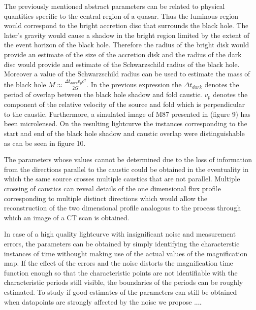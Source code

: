 The previously mentioned abstract parameters can be related to physical quantities specific to the central region of a quasar. Thus the luminous region would correspond to the bright accretion disc that surrounds the black hole. The later's gravity would cause a shadow in the bright region limited by the extent of the event horizon of the black hole. Therefore the radius of the bright disk would provide an estimate of the size of the accretion disk and the radius of the dark disc would provide and estimate of the Schwarzschild radius of the black hole. Moreover a value of the Schwarzschild radius 
can be used to estimate the mass of the black hole $M \approx \frac{\Delta t_{dark}  v_p c^2}{2G}$. In the previous 
expression the $\Delta t_{dark}$ denotes the period of overlap between the black hole shadow and fold caustic. 
$v_p$ denotes the component of the relative velocity of the source and fold which is perpendicular to the caustic.  Furthermore, a simulated image of M87 presented in \citep{2012MNRAS.421.1517D} (figure 9) has been microlensed. On the resulting lightcurve the instances corresponding to the start and end of the black hole shadow and caustic overlap were distinguishable as can be seen in figure 10.
    
The parameters whose values cannot be determined due to the loss of information from the directions parallel to the 
caustic could be obtained in the eventuality in which the same source crosses multiple caustics that are not parallel. 
Multiple crossing of caustics can reveal details of the one dimensional flux profile corresponding to multiple distinct 
directions which would allow the reconstruction of the two dimensional profile analogous to the process through which an image of a CT scan is obtained.  

In case of a high quality lightcurve with insignificant noise and measurement errors, the parameters can be obtained 
by simply identifying the characterstic instances of time withought making use of the actual values of the magnification
 map. If the effect of the errors and the noise distorts the magnification time function enough so that the 
characteristic points are not identifiable with the characteristic periods still visible, the boundaries of the periods 
can be roughly estimated. To study if good estimates of the parameters can still be obtained when datapoints are
 strongly affected by the noise we propose ....        



              

